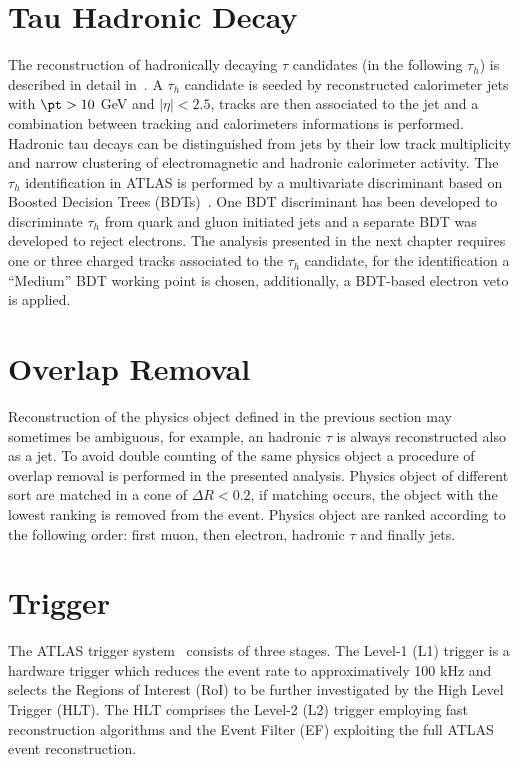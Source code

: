 \section{Tau Hadronic Decay}\label{sec:tau}
The reconstruction of hadronically decaying $\tau$ candidates (in the following $\tau_h$)
is described in detail in~\cite{AtlasCSCBook}.
A $\tau_h$ candidate is seeded by reconstructed calorimeter jets with $\pt > 10$ GeV and $|\eta| < 2.5$,
tracks are then associated to the jet and a combination between tracking and calorimeters informations
is performed.  Hadronic tau decays can be distinguished from jets by their low track multiplicity and 
narrow clustering of electromagnetic and hadronic calorimeter activity. The $\tau_h$ identification 
in ATLAS is performed by a multivariate discriminant based on Boosted Decision Trees (BDTs)~\cite{ATLASTAUIDnew}.
One BDT discriminant has been developed to discriminate $\tau_h$  from quark and gluon 
initiated jets and a separate BDT was developed to reject electrons.
The analysis presented in the next chapter requires one or three charged tracks associated to the $\tau_h$ candidate, 
for the identification a ``Medium'' BDT working point is chosen, additionally, a BDT-based electron veto is 
applied.

\section{Overlap Removal} \label{sec:olr}
Reconstruction of the physics object defined in the previous section may sometimes
be ambiguous, for example, an hadronic $\tau$ is always reconstructed also as a jet.
To avoid double counting of the same physics object a procedure of overlap removal is performed
in the presented analysis. Physics object of different sort are matched in a cone of $\Delta R <0.2$,
if matching occurs, the object with the lowest ranking is removed from the event. 
Physics object are ranked according to the following order: first muon, then electron, hadronic $\tau$ 
and finally jets.

\section{Trigger}
The ATLAS trigger system~\cite{trigger} consists of three stages. The Level-1 (L1) trigger is a
hardware trigger which reduces the event rate to approximatively 100 kHz and selects the Regions of
Interest (RoI) to be further investigated by the High Level Trigger (HLT). The HLT
comprises the Level-2 (L2) trigger employing fast reconstruction algorithms and the
Event Filter (EF) exploiting the full ATLAS event reconstruction.

